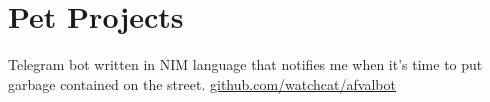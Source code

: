 \documentclass[]{hieudo-build}
\begin{document}
\begin{minipage}[t]{0.65\textwidth}
\section{Pet Projects}
\descript{}
Telegram bot written in NIM language that notifies me when it's time to put garbage contained on the street. \href{https://github.com/watchcat/afvalbot} {github.com/watchcat/afvalbot}
\sectionsep{}



\end{minipage} 
\end{document}
